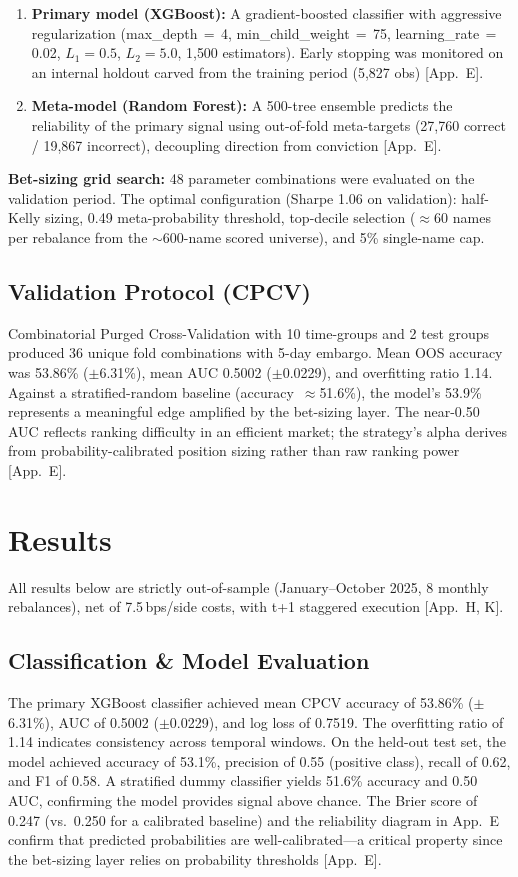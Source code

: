 \documentclass[11pt, a4paper]{article}
\begin{document}
\begin{enumerate}
    \item \textbf{Primary model (XGBoost):} A gradient-boosted classifier with aggressive regularization (max\_depth\,$=$\,4, min\_child\_weight\,$=$\,75, learning\_rate\,$=$\,0.02, $L_1 = 0.5$, $L_2 = 5.0$, 1{,}500 estimators). Early stopping was monitored on an internal holdout carved from the training period (5,827 obs) [App.\ E].
    \item \textbf{Meta-model (Random Forest):} A 500-tree ensemble predicts the reliability of the primary signal using out-of-fold meta-targets (27,760 correct / 19,867 incorrect), decoupling direction from conviction [App.\ E].
\end{enumerate}

\textbf{Bet-sizing grid search:} 48 parameter combinations were evaluated on the validation period. The optimal configuration (Sharpe 1.06 on validation): half-Kelly sizing, 0.49 meta-probability threshold, top-decile selection ($\approx$60 names per rebalance from the $\sim$600-name scored universe), and 5\% single-name cap.

\subsection{Validation Protocol (CPCV)}
Combinatorial Purged Cross-Validation with 10 time-groups and 2 test groups produced 36 unique fold combinations with 5-day embargo. Mean OOS accuracy was 53.86\% ($\pm$6.31\%), mean AUC 0.5002 ($\pm$0.0229), and overfitting ratio 1.14. Against a stratified-random baseline (accuracy~$\approx$51.6\%), the model's 53.9\% represents a meaningful edge amplified by the bet-sizing layer. The near-0.50 AUC reflects ranking difficulty in an efficient market; the strategy's alpha derives from probability-calibrated position sizing rather than raw ranking power [App.\ E].

\section{Results}
All results below are strictly out-of-sample (January--October 2025, 8 monthly rebalances), net of 7.5\,bps/side costs, with t+1 staggered execution [App.\ H, K].

\subsection{Classification \& Model Evaluation}
The primary XGBoost classifier achieved mean CPCV accuracy of 53.86\% ($\pm$6.31\%), AUC of 0.5002 ($\pm$0.0229), and log loss of 0.7519. The overfitting ratio of 1.14 indicates consistency across temporal windows. On the held-out test set, the model achieved accuracy of 53.1\%, precision of 0.55 (positive class), recall of 0.62, and F1 of 0.58. A stratified dummy classifier yields 51.6\% accuracy and 0.50 AUC, confirming the model provides signal above chance. The Brier score of 0.247 (vs.\ 0.250 for a calibrated baseline) and the reliability diagram in App.\ E confirm that predicted probabilities are well-calibrated---a critical property since the bet-sizing layer relies on probability thresholds [App.\ E].
\end{document}
